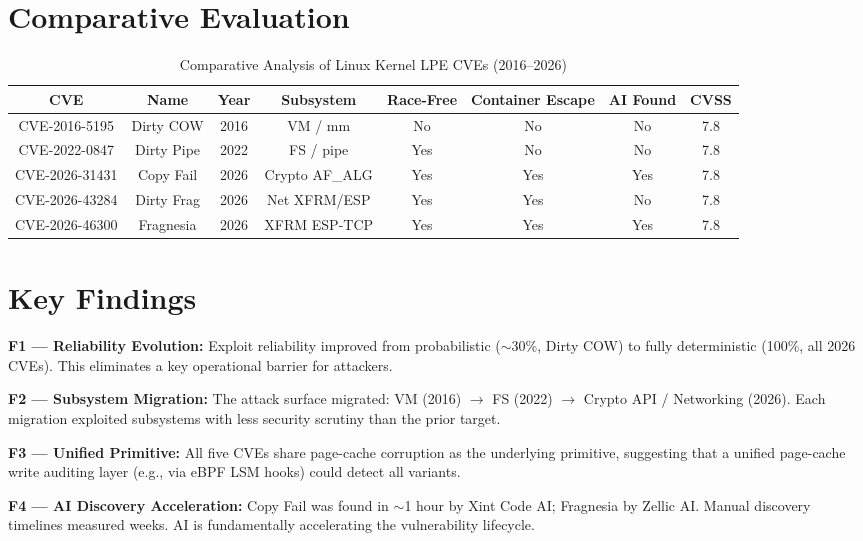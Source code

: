 \documentclass[conference]{IEEEtran}
\begin{document}
\section{Comparative Evaluation}

\begin{table}[htbp]
\caption{Comparative Analysis of Linux Kernel LPE CVEs (2016--2026)}
\begin{center}
\begin{tabular}{|c|c|c|c|c|c|c|c|}
\hline
\textbf{CVE} & \textbf{Name} & \textbf{Year} & \textbf{Subsystem} & \textbf{Race-Free} & \textbf{Container Escape} & \textbf{AI Found} & \textbf{CVSS} \\
\hline
CVE-2016-5195 & Dirty COW & 2016 & VM / mm & No & No & No & 7.8 \\
\hline
CVE-2022-0847 & Dirty Pipe & 2022 & FS / pipe & Yes & No & No & 7.8 \\
\hline
CVE-2026-31431 & Copy Fail & 2026 & Crypto AF\_ALG & Yes & Yes & Yes & 7.8 \\
\hline
CVE-2026-43284 & Dirty Frag & 2026 & Net XFRM/ESP & Yes & Yes & No & 7.8 \\
\hline
CVE-2026-46300 & Fragnesia & 2026 & XFRM ESP-TCP & Yes & Yes & Yes & 7.8 \\
\hline
\end{tabular}
\label{tab1}
\end{center}
\end{table}

\section{Key Findings}
\textbf{F1 --- Reliability Evolution:} Exploit reliability improved from probabilistic ($\sim$30\%, Dirty COW) to fully deterministic (100\%, all 2026 CVEs). This eliminates a key operational barrier for attackers.

\textbf{F2 --- Subsystem Migration:} The attack surface migrated: VM (2016) $\rightarrow$ FS (2022) $\rightarrow$ Crypto API / Networking (2026). Each migration exploited subsystems with less security scrutiny than the prior target.

\textbf{F3 --- Unified Primitive:} All five CVEs share page-cache corruption as the underlying primitive, suggesting that a unified page-cache write auditing layer (e.g., via eBPF LSM hooks) could detect all variants.

\textbf{F4 --- AI Discovery Acceleration:} Copy Fail was found in $\sim$1 hour by Xint Code AI; Fragnesia by Zellic AI. Manual discovery timelines measured weeks. AI is fundamentally accelerating the vulnerability lifecycle.
\end{document}
